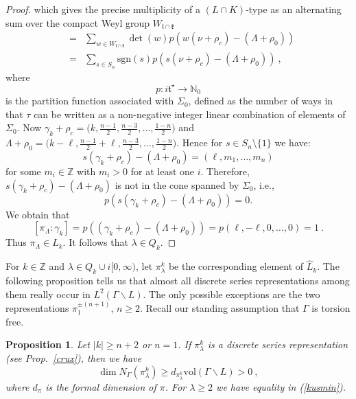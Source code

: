 \documentclass[10]{amsart}
\newtheorem{pro}[thm]{Proposition}
\theoremstyle{remark}
\theoremstyle{definition}
\numberwithin{equation}{section}
\newcommand{\Z}{\mathbb{Z}}         %
\newcommand{\sgn}{{\mathrm{sgn}}}
\newcommand{\vol}{{\mathrm{vol}}}
\newcommand{\fk}{{\mathfrak k}}
\newcommand{\fl}{{\mathfrak l}}
\newcommand{\ft}{{\mathfrak t}}
\newcommand{\be}{\begin{equation}}
\newcommand{\beu}{\begin{equation*}}
\begin{document}
{\begin{proof}
which gives the precise multiplicity of a $(L\cap K)$-type as an alternating sum over the compact Weyl group $W_{\fl\cap\fk}$
%
\begin{eqnarray*} [\pi_{\Lambda}:\nu]&=&\sum_{w\in W_{\fl\cap\fk}}\det(w) p(w(\nu+\rho_c)-(\Lambda+\rho_0))\\
&=&\sum_{s\in S_n}\sgn(s) p(s(\nu+\rho_c)-(\Lambda+\rho_0))\ ,
\end{eqnarray*}
%
where 
%
\beu
p:{i}\ft^\star\rightarrow\mathbb{N}_0
\end{equation*}
% 
is the partition function associated with $\Sigma_0$, defined as the number of ways in that $\tau$ can be written 
as a non-negative integer linear combination of elements of $\Sigma_0$. Now $\gamma_k+\rho_c=\big (k,\frac{n-1}{2},\frac{n-3}{2},\dots,\frac{1-n}{2}\big )$ 
and $\Lambda+\rho_0=\big (k-\ell,\frac{n-1}{2}+\ell,\frac{n-3}{2},\dots,\frac{1-n}{2}\big )$. Hence for $s\in S_n\setminus\{1\}$ we have:
%
$$ s(\gamma_k+\rho_c)-(\Lambda+\rho_0)=(\ell,m_1,\dots,m_n)$$
%
for some $m_i\in\mathbb{Z}$ with $m_i>0$ for at least one $i$. Therefore, $s(\gamma_k+\rho_c)-(\Lambda+\rho_0)$ is not in the cone spanned by $\Sigma_0$, i.e., 
%
\beu
p(s(\gamma_k+\rho_c)-(\Lambda+\rho_0))=0.
\end{equation*}
%
We obtain that
$$ [\pi_\Lambda:\gamma_k]=p((\gamma_k+\rho_c)-(\Lambda+\rho_0))=p(\ell,-\ell,0,\dots,0)=1\ .$$
Thus $\pi_{\Lambda}\in L_k$. It follows that $\lambda\in Q_k$.
\end{proof}
%
For 
$k\in \Z$ 
and $\lambda\in Q_{k}\cup i\lbrack 0,\infty)$, let $\pi_\lambda^k$ be the corresponding element of $\widehat L_k$. The following proposition tells
us that almost all discrete series representations among them really occur in $L^2(\Gamma\backslash L)$. The only possible exceptions are the two representations $\pi^{\pm(n+1)}_1$, $n\ge 2$.
Recall our standing assumption that $\Gamma$ is torsion free.

\begin{pro}\label{pavle}Let $|k|\ge n+2$ or $n=1$.
If $\pi_\lambda^k$ is a discrete series representation (see Prop.~\ref{crux}), then we have
\be\label{kusmin} 
\dim N_\Gamma(\pi_{\lambda}^{k})\ge d_{\pi_{\lambda}^{k}}\vol(\Gamma\backslash L)>0\ ,
\end{equation}
where $d_\pi$ is the formal dimension of $\pi$. For $\lambda\ge 2$ we have equality in (\ref{kusmin}).
\end{pro}

}
\end{document}
